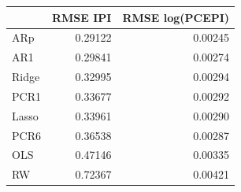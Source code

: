 \begin{tabular}{lrr}
\toprule
 & RMSE IPI & RMSE log(PCEPI) \\
\midrule
ARp & 0.29122 & 0.00245 \\
AR1 & 0.29841 & 0.00274 \\
Ridge & 0.32995 & 0.00294 \\
PCR1 & 0.33677 & 0.00292 \\
Lasso & 0.33961 & 0.00290 \\
PCR6 & 0.36538 & 0.00287 \\
OLS & 0.47146 & 0.00335 \\
RW & 0.72367 & 0.00421 \\
\bottomrule
\end{tabular}
